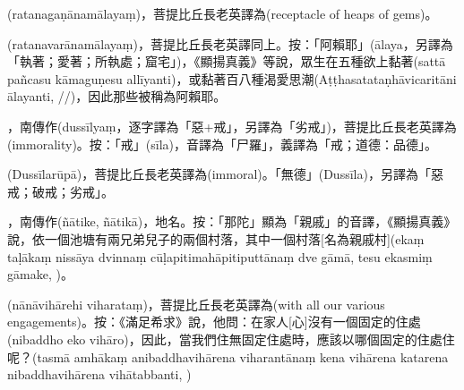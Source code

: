 \startitemgroup[noteitems]
\item{}(ratanagaṇānamālayaṃ)，菩提比丘長老英譯為(receptacle of heaps of gems)。
\item{}(ratanavarānamālayaṃ)，菩提比丘長老英譯同上。按：「阿賴耶」(ālaya，另譯為「執著；愛著；所執處；窟宅」)，《顯揚真義》等說，眾生在五種欲上黏著(sattā pañcasu kāmaguṇesu allīyanti)，或黏著百八種渴愛思潮(Aṭṭhasatataṇhāvicaritāni ālayanti, //)，因此那些被稱為阿賴耶。
\stopitemgroup

\startitemgroup[noteitems]
\item{}，南傳作(dussīlyaṃ，逐字譯為「惡+戒」，另譯為「劣戒」)，菩提比丘長老英譯為(immorality)。按：「戒」(sīla)，音譯為「尸羅」，義譯為「戒；道德：品德」。
\item{}(Dussīlarūpā)，菩提比丘長老英譯為(immoral)。「無德」(Dussīla)，另譯為「惡戒；破戒；劣戒」。
\stopitemgroup

\startitemgroup[noteitems]
\item{}，南傳作(ñātike, ñātikā)，地名。按：「那陀」顯為「親戚」的音譯，《顯揚真義》說，依一個池塘有兩兄弟兒子的兩個村落，其中一個村落[名為親戚村](ekaṃ taḷākaṃ nissāya dvinnaṃ cūḷapitimahāpitiputtānaṃ dve gāmā, tesu ekasmiṃ gāmake, )。
\stopitemgroup

\startitemgroup[noteitems]
\item{}(nānāvihārehi viharataṃ)，菩提比丘長老英譯為(with all our various engagements)。按：《滿足希求》說，他問：在家人[心]沒有一個固定的住處(nibaddho eko vihāro)，因此，當我們住無固定住處時，應該以哪個固定的住處住呢？(tasmā amhākaṃ anibaddhavihārena viharantānaṃ kena vihārena katarena nibaddhavihārena vihātabbanti, )
\stopitemgroup

